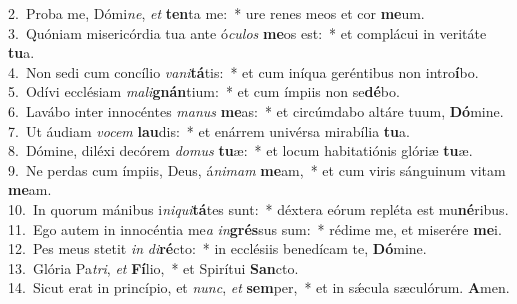 {2.~}Proba me, Dómi\textit{ne}, \textit{et} \textbf{ten}ta me:~* ure renes meos et cor \textbf{me}um.\\
{3.~}Quóniam misericórdia tua ante ó\textit{cu}\textit{los} \textbf{me}os est:~* et complácui in veritáte \textbf{tu}a.\\
{4.~}Non sedi cum concílio \textit{va}\textit{ni}\textbf{tá}tis:~* et cum iníqua geréntibus non intro\textbf{í}bo.\\
{5.~}Odívi ecclésiam \textit{ma}\textit{li}\textbf{gnán}tium:~* et cum ímpiis non se\textbf{dé}bo.\\
{6.~}Lavábo inter innocéntes \textit{ma}\textit{nus} \textbf{me}as:~* et circúmdabo altáre tuum, \textbf{Dó}mine.\\
{7.~}Ut áudiam \textit{vo}\textit{cem} \textbf{lau}dis:~* et enárrem univérsa mirabília \textbf{tu}a.\\
{8.~}Dómine, diléxi decórem \textit{do}\textit{mus} \textbf{tu}æ:~* et locum habitatiónis glóriæ \textbf{tu}æ.\\
{9.~}Ne perdas cum ímpiis, Deus, á\textit{ni}\textit{mam} \textbf{me}am,~* et cum viris sánguinum vitam \textbf{me}am.\\
{10.~}In quorum mánibus i\textit{ni}\textit{qui}\textbf{tá}tes sunt:~* déxtera eórum repléta est mu\textbf{né}ribus.\\
{11.~}Ego autem in innocéntia me\textit{a} \textit{in}\textbf{grés}sus sum:~* rédime me, et miserére \textbf{me}i.\\
{12.~}Pes meus stetit \textit{in} \textit{di}\textbf{ré}cto:~* in ecclésiis benedícam te, \textbf{Dó}mine.\\
{13.~}Glória Pa\textit{tri}, \textit{et} \textbf{Fí}lio,~* et Spirítui \textbf{San}cto.\\
{14.~}Sicut erat in princípio, et \textit{nunc}, \textit{et} \textbf{sem}per,~* et in sǽcula sæculórum. \textbf{A}men.\\
